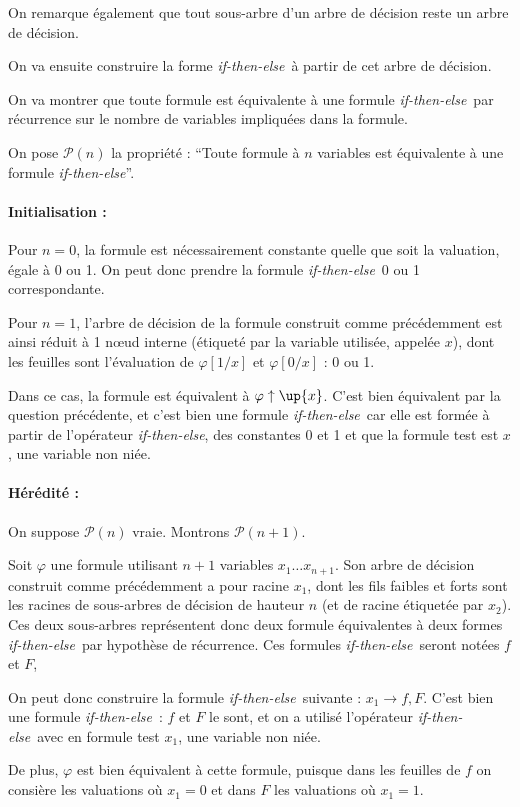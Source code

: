 \documentclass[12pt]{article}
\def\phix{\varphi\uparrow\up{x}}
\def\ite{\textit{if-then-else}}
\def\P{\mathcal{P}}
\begin{document}
On remarque également que tout sous-arbre d'un arbre de décision reste un arbre de décision. %

On va ensuite construire la forme \ite\ à partir de cet arbre de décision.

On va montrer que toute formule est équivalente à une formule \ite\ par récurrence sur le nombre de variables impliquées dans la formule.

On pose $\P(n)$ la propriété : ``Toute formule à $n$ variables est équivalente à une formule \ite''.

\paragraph{Initialisation : } 
Pour $n=0$, la formule est nécessairement constante quelle que soit la valuation, égale à 0 ou 1. On peut donc prendre la formule \ite\ 0 ou 1 correspondante.

Pour $n=1$, l'arbre de décision de la formule construit comme précédemment est ainsi réduit à 1 n\oe ud interne (étiqueté par la variable utilisée, appelée $x$), dont les feuilles sont l'évaluation de $\varphi [ 1/x ]$ et $\varphi [ 0/x ]$ : 0 ou 1.

Dans ce cas, la formule est équivalent à $\phix$. C'est bien équivalent par la question précédente, et c'est bien une formule \ite\ car elle est formée à partir de l'opérateur \ite, des constantes 0 et 1 et que la formule test est $x$, une variable non niée.

\paragraph{Hérédité : }
On suppose $\P (n)$ vraie. Montrons $\P (n+1)$.

Soit $\varphi$ une formule utilisant $n+1$ variables $x_1\dots x_{n+1}$. Son arbre de décision construit comme précédemment a pour racine $x_1$, dont les fils faibles et forts sont les racines de sous-arbres de décision de hauteur $n$ (et de racine étiquetée par $x_2$). Ces deux sous-arbres représentent donc deux formule équivalentes à deux formes \ite\ par hypothèse de récurrence. Ces formules \ite\ seront notées $f$ et $F$,

On peut donc construire la formule \ite\ suivante : $x_1\rightarrow f,F$. C'est bien une formule \ite\ : $f$ et $F$ le sont, et on a utilisé l'opérateur \ite\ avec en formule test $x_1$, une variable non niée.

De plus, $\varphi$ est bien équivalent à cette formule, puisque dans les feuilles de $f$ on consière les valuations où $x_1 = 0$ et dans $F$ les valuations où $x_1 = 1$.
\end{document}
